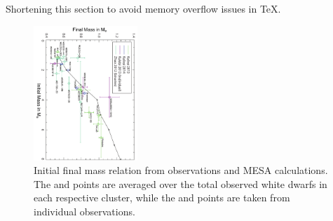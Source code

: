 \documentclass[fleqn,usenatbib]{mnras}
\begin{document}
Shortening this section to avoid memory overflow issues in TeX.

\begin{figure}
\centering\includegraphics[width=0.35\textwidth, angle=90]{if_mod2.pdf}
\caption{ Initial final mass relation from observations and MESA calculations. The \citealt{kalirai2013a} and \citealt{kalirai2013b} points are averaged over the total observed white dwarfs in each respective cluster, while the \citealt{kulebi2013} and \citealt{zhao2012} points are taken from individual observations.}
\label{fig:ifrelation}
\end{figure} 
\end{document}
